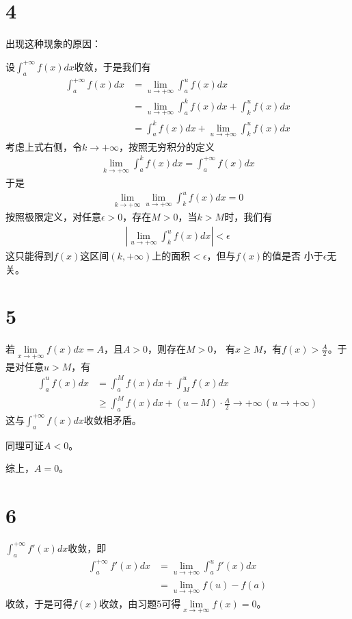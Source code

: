\documentclass{article}
\begin{document}
\section*{4}

出现这种现象的原因：

设$\int_{a}^{+\infty} f(x) dx$收敛，于是我们有
\begin{align*}
  \int_{a}^{+\infty} f(x) dx & = \lim\limits_{u \to +\infty} \int_{a}^{u} f(x) dx                        \\
                             & = \lim\limits_{u \to +\infty} \int_{a}^{k} f(x) dx + \int_{k}^{u} f(x) dx \\
                             & = \int_{a}^{k} f(x) dx + \lim\limits_{u \to +\infty} \int_{k}^{u} f(x) dx
\end{align*}
考虑上式右侧，令$k \to +\infty$，按照无穷积分的定义
\begin{align*}
  \lim \limits_{k \to +\infty} \int_{a}^{k} f(x) dx = \int_{a}^{+\infty} f(x) dx
\end{align*}
于是
\begin{align*}
  \lim\limits_{k \to +\infty} \lim\limits_{u \to +\infty} \int_{k}^{u} f(x) dx = 0
\end{align*}
按照极限定义，对任意$\epsilon > 0$，存在$M > 0$，当$k > M$时，我们有
\begin{align*}
  \left|\lim\limits_{u \to +\infty} \int_{k}^{u} f(x) dx \right| < \epsilon
\end{align*}
这只能得到$f(x)$这区间$(k, +\infty)$上的面积$< \epsilon$，但与$f(x)$的值是否
小于$\epsilon$无关。

\section*{5}

若$\lim\limits_{x \to +\infty} f(x) dx = A$，且$A > 0$，则存在$M > 0$，
有$x \geq M$，有$f(x) > \frac{A}{2}$。于是对任意$u > M$，有
\begin{align*}
  \int_{a}^{u} f(x) dx & = \int_{a}^{M} f(x) dx + \int_{M}^{u} f(x) dx                                        \\
                       & \geq  \int_{a}^{M} f(x) dx + (u - M)\cdot \frac{A}{2} \to +\infty \, (u \to +\infty)
\end{align*}
这与$\int_{a}^{+\infty} f(x) dx$收敛相矛盾。

同理可证$A < 0$。

综上，$A = 0$。

\section*{6}

$\int_{a}^{+\infty} f'(x) dx$收敛，即
\begin{align*}
  \int_{a}^{+\infty} f'(x) dx 
  & = \lim\limits_{u \to +\infty} \int_{a}^{u} f'(x) dx \\
  & = \lim\limits_{u \to +\infty} f(u) - f(a) 
\end{align*}
收敛，于是可得$f(x)$收敛，由习题5可得$\lim\limits_{x \to +\infty} f(x) = 0$。
\end{document}
